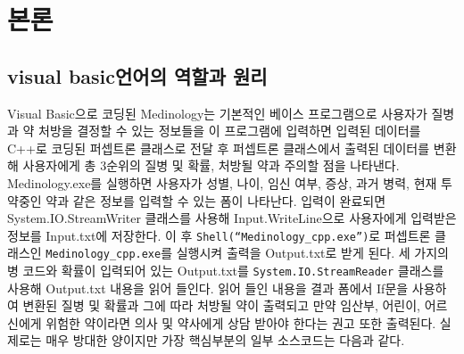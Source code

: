 \documentclass{report}
\begin{document}
\section{본론}
\subsection{visual basic언어의 역할과 원리}
Visual Basic으로 코딩된 Medinology는 기본적인 베이스 프로그램으로 사용자가 질병과 약 처방을 결정할 수 있는 정보들을 이 프로그램에 입력하면 입력된 데이터를 C++로 코딩된 퍼셉트론 클래스로 전달 후 퍼셉트론 클래스에서 출력된 데이터를 변환해 사용자에게 총 3순위의 질병 및 확률, 처방될 약과 주의할 점을 나타낸다.
Medinology.exe를 실행하면 사용자가 성별, 나이, 임신 여부, 증상, 과거 병력, 현재 투약중인 약과 같은 정보를 입력할 수 있는 폼이 나타난다. 입력이 완료되면 System.IO.StreamWriter 클래스를 사용해 Input.WriteLine으로 사용자에게 입력받은 정보를 Input.txt에 저장한다. 이 후 \lstinline{Shell(“Medinology_cpp.exe”)}로 퍼셉트론 클래스인 \lstinline{Medinology_cpp.exe}를 실행시켜 출력을 Output.txt로 받게 된다. 세 가지의 병 코드와 확률이 입력되어 있는 Output.txt를 \lstinline{System.IO.StreamReader} 클래스를 사용해 Output.txt 내용을 읽어 들인다. 읽어 들인 내용을 결과 폼에서 If문을 사용하여 변환된 질병 및 확률과 그에 따라 처방될 약이 출력되고 만약 임산부, 어린이, 어르신에게 위험한 약이라면 의사 및 약사에게 상담 받아야 한다는 권고 또한 출력된다. 실제로는 매우 방대한 양이지만 가장 핵심부분의 일부 소스코드는 다음과 같다.
\end{document}
